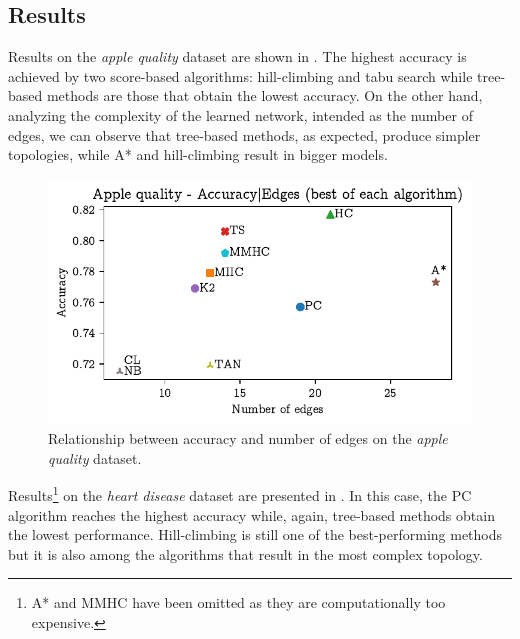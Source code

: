 \documentclass[letterpaper]{article}
\begin{document}

\subsection{Results}

Results on the \textit{apple quality} dataset are shown in .
The highest accuracy is achieved by two score-based algorithms: hill-climbing and tabu search
while tree-based methods are those that obtain the lowest accuracy.
On the other hand, analyzing the complexity of the learned network, intended as the number of edges,
we can observe that tree-based methods, as expected, produce simpler topologies, while A* and hill-climbing result in bigger models.

\begin{figure}[h]
    \centering
    \includegraphics[width=\linewidth]{img/apple_acc_edges.pdf}
    \caption{Relationship between accuracy and number of edges on the \textit{apple quality} dataset.}
    \label{img:apple}
\end{figure}

Results\footnote{A* and MMHC have been omitted as they are computationally too expensive.} 
on the \textit{heart disease} dataset are presented in .
In this case, the PC algorithm reaches the highest accuracy while, again, tree-based methods obtain the lowest performance.
Hill-climbing is still one of the best-performing methods but 
it is also among the algorithms that result in the most complex topology.
\end{document}
